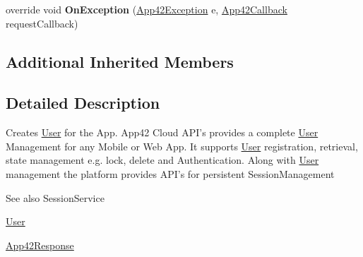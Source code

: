 \begin{DoxyCompactItemize}
\item 
\hypertarget{classcom_1_1shephertz_1_1app42_1_1paas_1_1sdk_1_1windows_1_1user_1_1_user_service_a7ca86a151265c6de00d3031e32fa13d1}{override void {\bfseries On\+Exception} (\hyperlink{classcom_1_1shephertz_1_1app42_1_1paas_1_1sdk_1_1windows_1_1_app42_exception}{App42\+Exception} e, \hyperlink{interfacecom_1_1shephertz_1_1app42_1_1paas_1_1sdk_1_1windows_1_1_app42_callback}{App42\+Callback} request\+Callback)}\label{classcom_1_1shephertz_1_1app42_1_1paas_1_1sdk_1_1windows_1_1user_1_1_user_service_a7ca86a151265c6de00d3031e32fa13d1}

\end{DoxyCompactItemize}
\subsection*{Additional Inherited Members}


\subsection{Detailed Description}
Creates \hyperlink{classcom_1_1shephertz_1_1app42_1_1paas_1_1sdk_1_1windows_1_1user_1_1_user}{User} for the App. App42 Cloud A\+P\+I's provides a complete \hyperlink{classcom_1_1shephertz_1_1app42_1_1paas_1_1sdk_1_1windows_1_1user_1_1_user}{User} Management for any Mobile or Web App. It supports \hyperlink{classcom_1_1shephertz_1_1app42_1_1paas_1_1sdk_1_1windows_1_1user_1_1_user}{User} registration, retrieval, state management e.\+g. lock, delete and Authentication. Along with \hyperlink{classcom_1_1shephertz_1_1app42_1_1paas_1_1sdk_1_1windows_1_1user_1_1_user}{User} management the platform provides A\+P\+I's for persistent Session\+Management 

\begin{DoxySeeAlso}{See also}
Session\+Service 

\hyperlink{classcom_1_1shephertz_1_1app42_1_1paas_1_1sdk_1_1windows_1_1user_1_1_user}{User} 

\hyperlink{classcom_1_1shephertz_1_1app42_1_1paas_1_1sdk_1_1windows_1_1_app42_response}{App42\+Response} 
\end{DoxySeeAlso}


